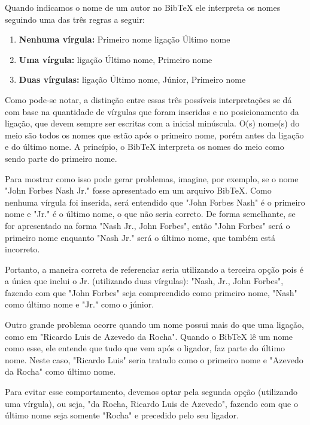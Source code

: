 \begin{anexosenv}
Quando indicamos o nome de um autor no BibTeX ele interpreta os nomes seguindo
uma das três regras a seguir:

\begin{enumerate}
    \item \textbf{Nenhuma vírgula:} {Primeiro nome} {ligação} {Último nome}

    \item \textbf{Uma vírgula:} {ligação} {Último nome}, {Primeiro nome}

    \item \textbf{Duas vírgulas:} {ligação} {Último nome}, {Júnior}, {Primeiro nome}
\end{enumerate}

Como pode-se notar, a distinção entre essas três possíveis interpretações se dá
com base na quantidade de vírgulas que foram inseridas e no posicionamento da
ligação, que devem sempre ser escritas com a inicial minúscula. O(s) nome(s) do
meio são todos os nomes que estão após o primeiro nome, porém antes da ligação e
do último nome. A princípio, o BibTeX interpreta os nomes do meio como sendo
parte do primeiro nome.

Para mostrar como isso pode gerar problemas, imagine, por exemplo, se o nome
"John Forbes Nash Jr."{} fosse apresentado em um arquivo BibTeX. Como nenhuma
vírgula foi inserida, será entendido que "John Forbes Nash"{} é o primeiro nome
e "Jr."{} é o último nome, o que não seria correto. De forma semelhante, se for
apresentado na forma "Nash Jr., John Forbes", então "John Forbes"{} será o
primeiro nome enquanto "Nash Jr."{} será o último nome, que também está
incorreto.

Portanto, a maneira correta de referenciar seria utilizando a terceira opção
pois é a única que inclui o Jr. (utilizando duas vírgulas):
"Nash, Jr., John Forbes"{}, fazendo com que "John Forbes"{} seja compreendido
como primeiro nome, "Nash"{} como último nome e "Jr."{} como o júnior.

Outro grande problema ocorre quando um nome possui mais do que uma ligação, como
em "Ricardo Luis de Azevedo da Rocha"{}. Quando o BibTeX lê um nome como esse,
ele entende que tudo que vem após o ligador, faz parte do último nome. Neste
caso, "Ricardo Luis"{} seria tratado como o primeiro nome e "Azevedo da Rocha"{}
como último nome.

Para evitar esse comportamento, devemos optar pela segunda opção (utilizando uma
vírgula), ou seja, "da Rocha, Ricardo {Luis de} Azevedo"{}, fazendo com que o
último nome seja somente "Rocha"{} e precedido pelo seu ligador.


\end{anexosenv}
